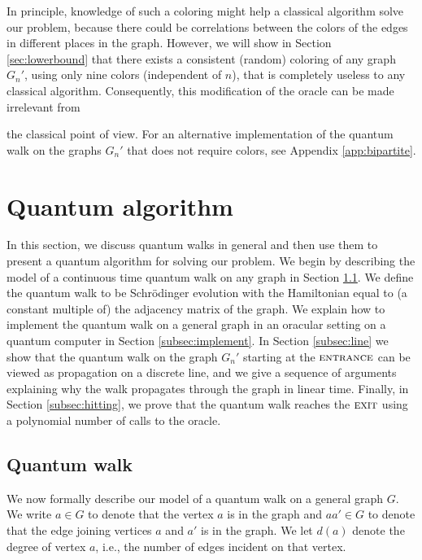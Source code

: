 \documentclass[aps,11pt,twoside,nofootinbib,tightenlines,superscriptaddress,preprintnumbers]{revtex4}
\newcommand{\<}{\langle}
\renewcommand{\>}{\rangle}
\newcommand{\ent}{{\textsc{entrance}}}
\newcommand{\exit}{{\textsc{exit}}}
\begin{document}
In principle, knowledge of such a coloring might help a classical
algorithm solve our problem, because there could be correlations between
the colors of the edges in different places in the graph.  However, we
will show in Section \ref{sec:lowerbound} that there exists a consistent
(random) coloring of any graph $G_n'$, using only nine colors (independent
of $n$), that is completely useless to any classical algorithm.
Consequently, this modification of the oracle can be made irrelevant from 

the classical point of view.  For an alternative implementation of the
quantum walk on the graphs $G_n'$ that does not require colors, see
Appendix \ref{app:bipartite}.

\section{Quantum algorithm}\label{sec:algorithm}

In this section, we discuss quantum walks in general and then use them to
present a quantum algorithm for solving our problem.  We begin by
describing the model of a continuous time quantum walk on any graph in
Section \ref{subsec:qwalk}.  We define the quantum walk to be
Schr\"odinger evolution with the Hamiltonian equal to (a constant multiple
of) the adjacency matrix of the graph.  We explain how to implement the
quantum walk on a general graph in an oracular setting on a quantum
computer in Section \ref{subsec:implement}.  In Section \ref{subsec:line}
we show that the quantum walk on the graph $G_n'$ starting at the $\ent$
can be viewed as propagation on a discrete line, and we give a sequence of
arguments explaining why the walk propagates through the graph in linear
time.  Finally, in Section \ref{subsec:hitting}, we prove that the quantum
walk reaches the $\exit$ using a polynomial number of calls to the oracle.

\subsection{Quantum walk}\label{subsec:qwalk}

We now formally describe our model of a quantum walk on a general graph
$G$.  We write $a \in G$ to denote that the vertex $a$ is in the graph and
$aa' \in G$ to denote that the edge joining vertices $a$ and $a'$ is in
the graph.  We let $d(a)$ denote the degree of vertex $a$, i.e., the
number of edges incident on that vertex.
\end{document}

